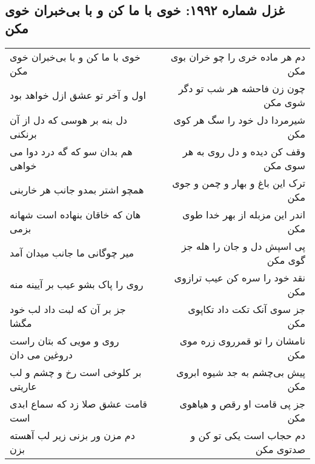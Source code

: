 \begin{center}
\section*{غزل شماره ۱۹۹۲: خوی با ما کن و با بی‌خبران خوی مکن}
\label{sec:1992}
\begin{longtable}{l p{0.5cm} r}
خوی با ما کن و با بی‌خبران خوی مکن
&&
دم هر ماده خری را چو خران بوی مکن
\\
اول و آخر تو عشق ازل خواهد بود
&&
چون زن فاحشه هر شب تو دگر شوی مکن
\\
دل بنه بر هوسی که دل از آن برنکنی
&&
شیرمردا دل خود را سگ هر کوی مکن
\\
هم بدان سو که گه درد دوا می خواهی
&&
وقف کن دیده و دل روی به هر سوی مکن
\\
همچو اشتر بمدو جانب هر خاربنی
&&
ترک این باغ و بهار و چمن و جوی مکن
\\
هان که خاقان بنهاده است شهانه بزمی
&&
اندر این مزبله از بهر خدا طوی مکن
\\
میر چوگانی ما جانب میدان آمد
&&
پی اسپش دل و جان را هله جز گوی مکن
\\
روی را پاک بشو عیب بر آیینه منه
&&
نقد خود را سره کن عیب ترازوی مکن
\\
جز بر آن که لبت داد لب خود مگشا
&&
جز سوی آنک تکت داد تکاپوی مکن
\\
روی و مویی که بتان راست دروغین می دان
&&
نامشان را تو قمرروی زره موی مکن
\\
بر کلوخی است رخ و چشم و لب عاریتی
&&
پیش بی‌چشم به جد شیوه ابروی مکن
\\
قامت عشق صلا زد که سماع ابدی است
&&
جز پی قامت او رقص و هیاهوی مکن
\\
دم مزن ور بزنی زیر لب آهسته بزن
&&
دم حجاب است یکی تو کن و صدتوی مکن
\\
\end{longtable}
\end{center}
